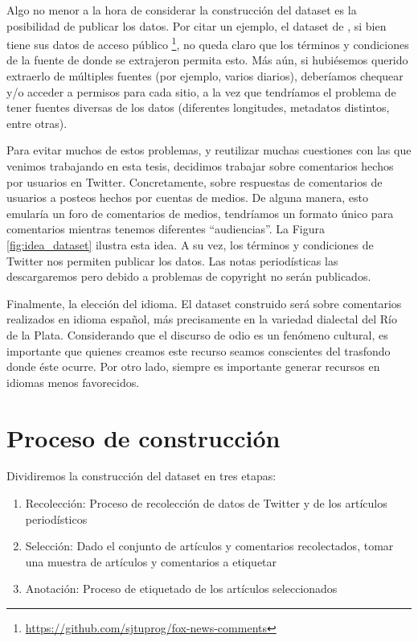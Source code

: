 Algo no menor a la hora de considerar la construcción del dataset es la posibilidad de publicar los datos. Por citar un ejemplo, el dataset de \citet{gao-huang-2017-detecting}, si bien tiene sus datos de acceso público \footnote{\url{https://github.com/sjtuprog/fox-news-comments}}, no queda claro que los términos y condiciones de la fuente de donde se extrajeron permita esto. Más aún, si hubiésemos querido extraerlo de múltiples fuentes (por ejemplo, varios diarios), deberíamos chequear y/o acceder a permisos para cada sitio, a la vez que tendríamos el problema de tener fuentes diversas de los datos (diferentes longitudes, metadatos distintos, entre otras).

Para evitar muchos de estos problemas, y reutilizar muchas cuestiones con las que venimos trabajando en esta tesis, decidimos trabajar sobre comentarios hechos por usuarios en Twitter. Concretamente, sobre respuestas de comentarios de usuarios a posteos hechos por cuentas de medios. De alguna manera, esto emularía un foro de comentarios de medios, tendríamos un formato único para comentarios mientras tenemos diferentes ``audiencias''. La Figura \ref{fig:idea_dataset} ilustra esta idea. A su vez, los términos y condiciones de Twitter nos permiten publicar los datos. Las notas periodísticas las descargaremos pero debido a problemas de copyright no serán publicados.

Finalmente, la elección del idioma. El dataset construido será sobre comentarios realizados en idioma español, más precisamente en la variedad dialectal del Río de la Plata. Considerando que el discurso de odio es un fenómeno cultural, es importante que quienes creamos este recurso seamos conscientes del trasfondo donde éste ocurre. Por otro lado, siempre es importante generar recursos en idiomas menos favorecidos.


\section{Proceso de construcción}

Dividiremos la construcción del dataset en tres etapas:

\begin{enumerate}
    \item Recolección: Proceso de recolección de datos de Twitter y de los artículos periodísticos
    \item Selección: Dado el conjunto de artículos y comentarios recolectados, tomar una muestra de artículos y comentarios a etiquetar
    \item Anotación: Proceso de etiquetado de los artículos seleccionados
\end{enumerate}

